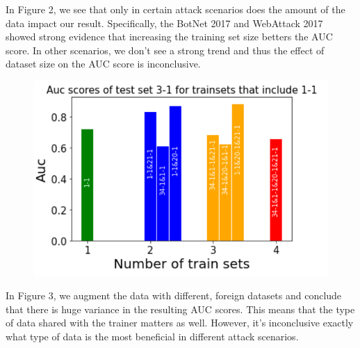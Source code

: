 In Figure 2, we see that only in certain attack scenarios does the amount of the data impact our result. Specifically, the BotNet 2017 and WebAttack 2017 showed strong evidence that increasing the training set size betters the AUC score. In other scenarios, we don't see a strong trend and thus the effect of dataset size on the AUC score is inconclusive.

\begin{figure}[H]
    \centering
    \includegraphics[width=1\linewidth]{data.png}
    \caption{}
\end{figure}

In Figure 3, we augment the data with different, foreign datasets and conclude that there is huge variance in the resulting AUC scores. This means that the type of data shared with the trainer matters as well. However, it's inconclusive exactly what type of data is the most beneficial in different attack scenarios.

\label{sec:results}
